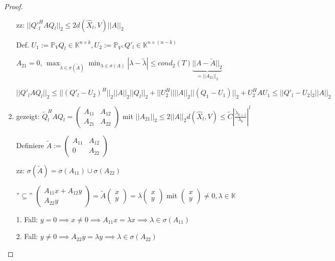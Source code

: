 \begin{proof}
\begin{enumerate}
		zz: $||{Q'}_l^HAQ_l||_2 \leq 2d(\hat{X}_l, V) ||A||_2$
		
		Def. $U_1 := \mathbb{P}_V Q_l \in \mathbb{K}^{n\times k}, U_2 := \mathbb{P}_{V^\perp}Q'_l \in \mathbb{K}^{n\times(n-k)}$
		
		$A_{21} = 0$, $\max_{\tilde{\lambda} \in \sigma(\tilde{A})} \min_{\lambda \in \sigma(A)} |\lambda - \tilde{\lambda}| \leq cond_2(T) \underbrace{||A - \tilde{A}||_2}_{=||A_{21}||_2}$
		
		$||Q'_lAQ_l||_2 \leq ||(Q'_l - U_2)^H||_2 ||A||_2 ||Q_l||_2 + ||U_2^H|| ||A||_2 ||(Q_1 - U_1)||_2 + U_2^H AU_1 \leq ||Q'_l - U_2|_2 ||A||_2$
		
		\item gezeigt: $\tilde{Q}_l^HAQ_l = \left(\begin{matrix}
			A_{11} & A_{12}\\
			A_{21} & A_{22}
		\end{matrix}\right)$ mit $||A_{21}||_2 \leq 2 ||A||_2 d(\hat{X}_l, V) \leq \tilde{C} \left|  \frac{\tilde{\lambda}_{k+1}}{\lambda_k}\right|^l$
		
		Definiere $\tilde{A} := \left(\begin{matrix}
			A_{11} & A_{12}\\
			0 & A_{22}
		\end{matrix}\right)$
		
		zz: $\sigma(\tilde{A}) = \sigma(A_{11}) \cup \sigma(A_{22})$
		
		''$\subseteq$'' $\left(\begin{matrix}
			A_{11}x + A_{12}y\\
			A_{22}y
		\end{matrix}\right) = \tilde{A}\left(\begin{matrix}
			x\\ y
		\end{matrix}\right) = \lambda\left(\begin{matrix}
			x\\
			y
		\end{matrix}\right)$ mit $\left(\begin{matrix}
			x\\
			y
		\end{matrix}\right) \neq 0, \lambda \in \mathbb{K}$
		
		1. Fall: $y = 0 \implies x \neq 0 \implies A_{11}x = \lambda x \implies \lambda \in \sigma(A_{11})$
		
		2. Fall: $y \neq 0 \implies A_{22}y = \lambda y \implies \lambda \in \sigma(A_{22})$
		

\end{enumerate}
\end{proof}
